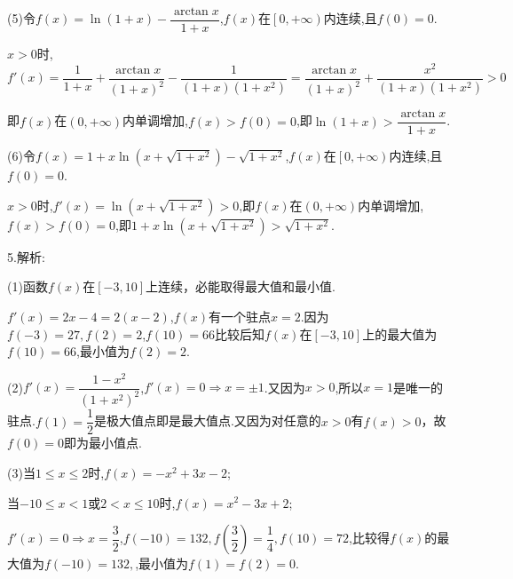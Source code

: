 (5)令$f\left( x \right) = \ln \left( {1 + x} \right) - \dfrac{{\arctan x}}{{1 + x}}$,$f\left( x \right)$在$\left[ {0, + \infty } \right)$内连续,且$f\left( 0 \right) = 0$.

$x > 0$时,$f'\left( x \right) = \dfrac{1}{{1 + x}} + \dfrac{{\arctan x}}{{{{\left( {1 + x} \right)}^2}}} - \dfrac{1}{{\left( {1 + x} \right)\left( {1 + {x^2}} \right)}} = \dfrac{{\arctan x}}{{{{\left( {1 + x} \right)}^2}}} + \dfrac{{{x^2}}}{{\left( {1 + x} \right)\left( {1 + {x^2}} \right)}} > 0$

即$f(x)$在$\left( {0, + \infty } \right)$内单调增加,$f\left( x \right) > f\left( 0 \right) = 0$,即$\ln \left( {1 + x} \right) > \dfrac{{\arctan x}}{{1 + x}}$.

(6)令$f\left( x \right) = 1 + x\ln \left( {x + \sqrt {1 + {x^2}} } \right) - \sqrt {1 + {x^2}} $,$f(x)$在$\left[ {0, + \infty } \right)$内连续,且$f\left( 0 \right) = 0$.

$x > 0$时,$f'\left( x \right) = \ln \left( {x + \sqrt {1 + {x^2}} } \right) > 0$,即$f(x)$在$\left( {0, + \infty } \right)$内单调增加,$f\left( x \right) > f\left( 0 \right) = 0$,即$1 + x\ln \left( {x + \sqrt {1 + {x^2}} } \right) > \sqrt {1 + {x^2}} $.

5.解析:

(1)函数$f(x)$在$\left[ { - 3,10} \right]$上连续，必能取得最大值和最小值.

$f'\left( x \right) = 2x - 4 = 2\left( {x - 2} \right)$,$f\left( x \right)$有一个驻点$x = 2$.因为$f\left( { - 3} \right) = 27,f\left( 2 \right) = 2$,$f\left( {10} \right) = 66$比较后知$f(x)$在$\left[ { - 3,10} \right]$上的最大值为$f\left( {10} \right) = 66$,最小值为$f\left( 2 \right) = 2$.

(2)$f'\left( x \right) = \dfrac{{1 - {x^2}}}{{{{\left( {1 + {x^2}} \right)}^2}}}$,$f'\left( x \right) = 0 \Rightarrow x =  \pm 1$.又因为$x > 0$,所以$x = 1$是唯一的驻点.$f\left( 1 \right) = \dfrac{1}{2}$是极大值点即是最大值点.又因为对任意的$x > 0$有$f\left( x \right) > 0$，故$f\left( 0 \right) = 0$即为最小值点.

(3)当$1 \le x \le 2$时,$f\left( x \right) =  - {x^2} + 3x - 2$;

当$ - 10 \le x < 1$或$2 < x \le 10$时,$f\left( x \right) = {x^2} - 3x + 2$;

$f'\left( x \right) = 0 \Rightarrow x = \dfrac{3}{2}$,$f\left( { - 10} \right) = 132,f\left( {\dfrac{3}{2}} \right) = \dfrac{1}{4},f\left( {10} \right) = 72$,比较得$f\left( x \right)$的最大值为$f\left( { - 10} \right) = 132,$,最小值为$f\left( 1 \right) = f\left( 2 \right) = 0$.

